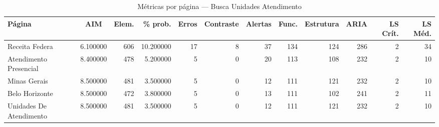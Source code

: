 \begin{table}[htbp]
  \centering
  \caption{Métricas por página — Busca Unidades Atendimento}
  \label{tab:flow_busca_unidades_atendimento}
  \small
  \begin{tabular}{lcrrrrrrrrrr}
\toprule
Página & AIM & Elem. & \% prob. & Erros & Contraste & Alertas & Func. & Estrutura & ARIA & LS Crít. & LS Méd. \\
\midrule
Receita Federa & 6.100000 & 606 & 10.200000 & 17 & 8 & 37 & 134 & 124 & 286 & 2 & 34 \\
Atendimento Presencial & 8.400000 & 478 & 5.200000 & 5 & 0 & 20 & 113 & 108 & 232 & 2 & 10 \\
Minas Gerais & 8.500000 & 481 & 3.500000 & 5 & 0 & 12 & 111 & 121 & 232 & 2 & 10 \\
Belo Horizonte & 8.500000 & 472 & 3.800000 & 5 & 0 & 13 & 111 & 102 & 241 & 2 & 11 \\
Unidades De Atendimento & 8.500000 & 481 & 3.500000 & 5 & 0 & 12 & 111 & 121 & 232 & 2 & 10 \\
\bottomrule
\end{tabular}
\end{table}
